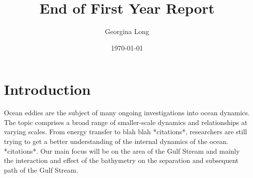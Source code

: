 \documentclass[a4paper,11pt]{article}
\newcommand{\subtitle}[1]{%
  \posttitle{%
    \par\end{center}
    \begin{center}\large#1\end{center}
    \vskip0.5em}%
}
\begin{document}


\title{End of First Year Report}
\subtitle{Draft}
\author{Georgina Long}

\date{\mydate\today}

\maketitle


\section{Introduction}

Ocean eddies are the subject of many ongoing investigations into ocean dynamics. The topic comprises a broad range of smaller-scale dynamics and relationships at varying scales. From energy transfer to blah blah *citations*, researchers are still trying to get a better understanding of the internal dynamics of the ocean. *citations*. Our main focus will be on the area of the Gulf Stream and mainly the interaction and effect of the bathymetry on the separation and subsequent path of the Gulf Stream.
\end{document}
